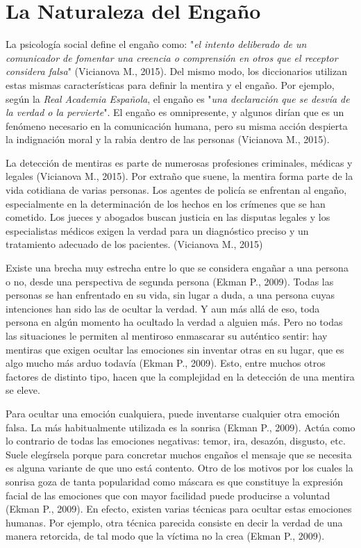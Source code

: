 \section{La Naturaleza del Engaño}
La psicología social define el engaño como: "\textit{el intento deliberado de un comunicador de fomentar una creencia o comprensión en otros que el receptor considera falsa}" (Vicianova M., 2015). Del mismo modo, los diccionarios utilizan estas mismas características para definir la mentira y el engaño. Por ejemplo, según la \textit{Real Academia Española}, el engaño es "\textit{una declaración que se desvía de la verdad o la pervierte}". El engaño es omnipresente, y algunos dirían que es un fenómeno necesario en la comunicación humana, pero su misma acción despierta la indignación moral y la rabia dentro de las personas (Vicianova M., 2015). 

La detección de mentiras es parte de numerosas profesiones criminales, médicas y legales (Vicianova M., 2015). Por extraño que suene, la mentira forma parte de la vida cotidiana de varias personas. Los agentes de policía se enfrentan al engaño, especialmente en la determinación de los hechos en los crímenes que se han cometido. Los jueces y abogados buscan justicia en las disputas legales y los especialistas médicos exigen la verdad para un diagnóstico preciso y un tratamiento adecuado de los pacientes. (Vicianova M., 2015)

Existe una brecha muy estrecha entre lo que se considera engañar a una persona o no, desde una perspectiva de segunda persona (Ekman P., 2009). Todas las personas se han enfrentado en su vida, sin lugar a duda, a una persona cuyas intenciones han sido las de ocultar la verdad. Y aun más allá de eso, toda persona en algún momento ha ocultado la verdad a alguien más. Pero no todas las situaciones le permiten al mentiroso enmascarar su auténtico sentir: hay mentiras que exigen ocultar las emociones sin inventar otras en su lugar, que es algo mucho más arduo todavía (Ekman P., 2009). Esto, entre muchos otros factores de distinto tipo, hacen que la complejidad en la detección de una mentira se eleve.

Para ocultar una emoción cualquiera, puede inventarse cualquier otra emoción falsa. La más habitualmente utilizada es la sonrisa (Ekman P., 2009). Actúa como lo contrario de todas las emociones negativas: temor, ira, desazón, disgusto, etc. Suele elegírsela porque para concretar muchos engaños el mensaje que se necesita es alguna variante de que uno está contento. Otro de los motivos por los cuales la sonrisa goza de tanta popularidad como máscara es que constituye la expresión facial de las emociones que con mayor facilidad puede producirse a voluntad (Ekman P., 2009). En efecto, existen varias técnicas para ocultar estas emociones humanas. Por ejemplo, otra técnica parecida consiste en decir la verdad de una manera retorcida, de tal modo que la víctima no la crea (Ekman P., 2009).

